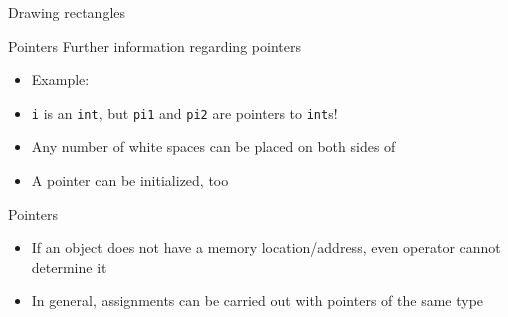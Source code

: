 \documentclass[usenames,dvipsnames,aspectratio=169]{beamer}
\begin{document}
\begin{frame}{Drawing rectangles}
  \begin{exampleblock}{}
    \tiny
    
  \end{exampleblock}
\end{frame}

\begin{frame}{Pointers}
  Further information regarding pointers
  \begin{itemize}
    \item Example: 
    \item {} \texttt{i} is an \texttt{int}, but \texttt{pi1} and \texttt{pi2} are pointers to \texttt{int}s!
    \item Any number of white spaces can be placed on both sides of \kiemel{*}
    \item A pointer can be initialized, too
  \end{itemize}
  \begin{exampleblock}{}
    
  \end{exampleblock}
\end{frame}

\begin{frame}{Pointers}
  \begin{itemize}
    \item If an object does not have a memory location/address, even operator \kiemel{\&} cannot determine it
  \end{itemize}
  \begin{alertblock}{}
    \small
    
  \end{alertblock}
  \begin{itemize}
    \item In general, assignments can be carried out with pointers of the same type
  \end{itemize}
  \begin{alertblock}{}
    \small
    
  \end{alertblock}
\end{frame}
\end{document}
